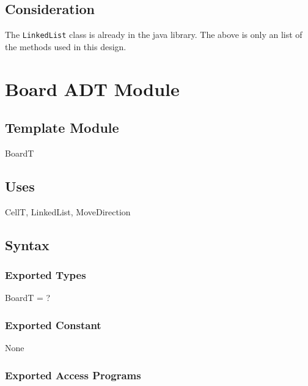 \documentclass[12pt]{article}
\begin{document}
\subsection*{Consideration}
The \verb|LinkedList| class is already in the java library. The above is only an list of the methods used in this design.

\newpage

\section* {Board ADT Module}

\subsection*{Template Module}

BoardT

\subsection* {Uses}

CellT, LinkedList, MoveDirection

\subsection* {Syntax}

\subsubsection* {Exported Types}

BoardT = ?

\subsubsection* {Exported Constant}

None

\subsubsection* {Exported Access Programs}
\end{document}
